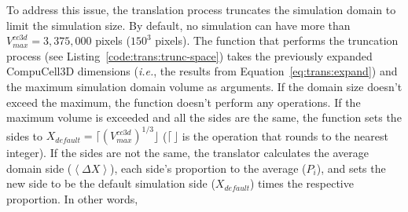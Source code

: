 To address this issue, the translation process truncates the simulation domain to limit the simulation size. By default, no simulation can have more than $V^{cc3d}_{max} = 3,375,000$ pixels ($150^3$ pixels). The function that performs the truncation process (see Listing~\ref{code:trans:trunc-space}) takes the previously expanded CompuCell3D dimensions (\textit{i.e.}, the results from Equation~\ref{eq:trans:expand}) and the maximum simulation domain volume as arguments.  If the domain size doesn’t exceed the maximum, the function doesn’t perform any operations. If the maximum volume is exceeded and all the sides are the same, the function sets the sides to $X_{default} = \lceil (V^{cc3d}_{max})^{1/3}\rfloor$ ($\lceil \,\rfloor$ is the operation that rounds to the nearest integer). If the sides are not the same, the translator calculates the average domain side ($\left<\Delta X\right>$), each side's proportion to the average ($P_i$), and sets the new side to be the default simulation side ($X_{default}$) times the respective proportion. In other words,




